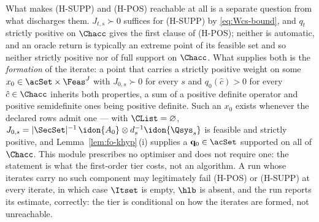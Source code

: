 
\begin{remark}\label{rem:fo-reachability}
What makes (H-SUPP) and (H-POS) reachable at all is a separate question from
what discharges them. $J_{t,s}\succ0$ suffices for (H-SUPP) by
\eqref{eq:Wcs-bound}, and $q_t$ strictly positive on $\Chacc$ gives the
first clause of (H-POS); neither is automatic, and an oracle return is
typically an extreme point of its feasible set and so neither strictly
positive nor of full support on $\Chacc$. What supplies both is the
\emph{formation} of the iterate: a point that carries a strictly positive
weight on some $x_{0}\in\acSet\times\Feas^{J}$ with $J_{0,s}\succ0$ for
every $s$ and $q_{0}(\hat c)>0$ for every $\hat c\in\Chacc$ inherits both
properties, a sum of a positive definite operator and positive semidefinite
ones being positive definite. Such an $x_0$ exists whenever the declared
rows admit one --- with $\CList=\varnothing$,
$J_{0,s}=|\SecSet|^{-1}\,\idon{A_0}\otimes d_s^{-1}\idon{\Qsys_s}$ is
feasible and strictly positive, and Lemma~\ref{lem:fo-khyp}\,(i) supplies a
$\mathbf q_{0}\in\acSet$ supported on all of $\Chacc$. This module
prescribes no optimiser and does not require one: the statement is what the
first-order tier costs, not an algorithm. A run whose iterates carry no such
component may legitimately fail (H-POS) or (H-SUPP) at every iterate, in
which case $\Itset$ is empty, $\hlb$ is absent, and the run reports its
estimate, correctly: the tier is conditional on how the iterates are formed,
not unreachable.
\end{remark}
